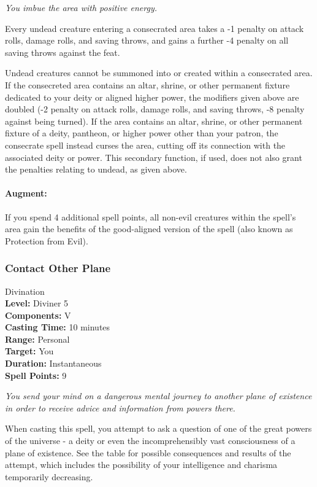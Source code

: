 \emph{You imbue the area with positive energy.}

Every undead creature entering a consecrated area takes a -1 penalty on attack rolls, damage rolls, and saving throws,
and gains a further -4 penalty on all saving throws against the  feat.

Undead creatures cannot be summoned into or created within a consecrated area.
If the consecreted area contains an altar, shrine, or other permanent fixture dedicated to your deity or aligned higher power, 
the modifiers given above are doubled (-2 penalty on attack rolls, damage rolls, and saving throws, -8 penalty against being turned). 
If the area contains an altar, shrine, or other permanent fixture of a deity, pantheon, or higher power other than your
patron, the consecrate spell instead curses the area, cutting off its connection with the associated deity or power. 
This secondary function, if used, does not also grant the penalties relating to undead, as given above.

\paragraph{Augment:} If you spend 4 additional spell points, all non-evil creatures within the spell's area gain the benefits of the good-aligned version of the
 spell (also known as Protection from Evil).
\subsubsection{Contact Other Plane}
\label{Spell:ContactOtherPlane}
Divination
\\ \textbf{Level:} Diviner 5
\\ \textbf{Components:} V
\\ \textbf{Casting Time:} 10 minutes
\\ \textbf{Range:} Personal
\\ \textbf{Target:} You
\\ \textbf{Duration:} Instantaneous
\\ \textbf{Spell Points:} 9

\emph{You send your mind on a dangerous mental journey to another plane of existence in order to receive advice and information from powers there.}

When casting this spell, you attempt to ask a question of one of the great powers of the universe - a deity or even the incomprehensibly vast consciousness of a plane of existence.
See the  table for possible consequences and results of the attempt, which includes the possibility of your intelligence and charisma temporarily decreasing.

